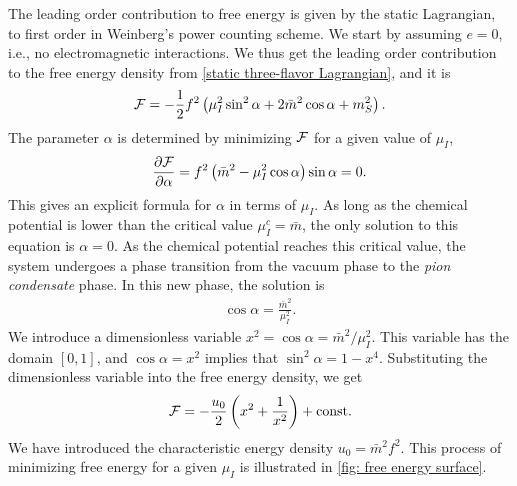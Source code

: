 The leading order contribution to free energy is given by the static Lagrangian, to first order in Weinberg's power counting scheme.
We start by assuming $e = 0$, i.e., no electromagnetic interactions.
We thus get the leading order contribution to the free energy density from \autoref{static three-flavor Lagrangian}, and it is
%
\begin{equation}
    \label{free energy pion condensate}
    \mathcal{F} 
    = 
    - \frac{1}{2} f^2
    \left(
        \mu_I^2 \sin^2\alpha
        + 2\bar m^2 \cos\alpha
        + m_S^2
    \right).
\end{equation}
%
The parameter $\alpha$ is determined by minimizing $\mathcal{F}$ for a given value of $\mu_I$,
%
\begin{equation}
    \pdv{\mathcal{F}}{\alpha} = f^2 \left(\bar m^2 - \mu_I^2 \cos \alpha\right) \sin\alpha = 0.
\end{equation}
%
This gives an explicit formula for $\alpha$ in terms of $\mu_I$.
As long as the chemical potential is lower than the critical value $\mu_I^c = \bar m$, the only solution to this equation is $\alpha = 0$.
As the chemical potential reaches this critical value, the system undergoes a phase transition from the vacuum phase to the \emph{pion condensate} phase.
In this new phase, the solution is
%
\begin{align}
    \label{alpha as function of mu lowest order}
    \cos \alpha = \frac{\bar m^2}{\mu_I^2}.
\end{align}
%
We introduce a dimensionless variable $x^2 = \cos\alpha = \bar m^2 / \mu_I^2$.
This variable has the domain $[0, 1]$, and $\cos \alpha = x^2$ implies that $\sin^2 \alpha = 1 - x^4$.
Substituting the dimensionless variable into the free energy density, we get 
%
\begin{equation}
    \mathcal{F} = - \frac{u_0}{2} \left( x^2 + \frac{1}{x^2} \right) +\mathrm{const.}
\end{equation}
%
We have introduced the characteristic energy density $u_0 = \bar m^2 f^2$.
This process of minimizing free energy for a given $\mu_I$ is illustrated in \autoref{fig: free energy surface}.



